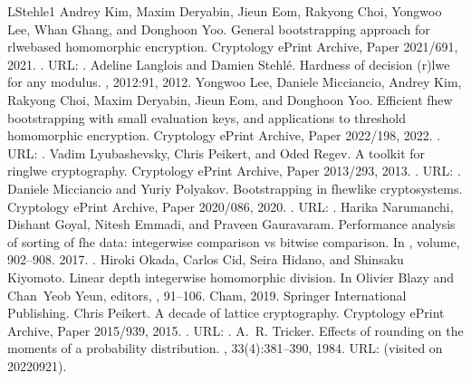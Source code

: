 \documentclass[letterpaper,10pt,english]{jupyterBook}
\begin{document}
\begin{sphinxthebibliography}{LStehle1}
\sphinxAtStartPar
Andrey Kim, Maxim Deryabin, Jieun Eom, Rakyong Choi, Yongwoo Lee, Whan Ghang, and Donghoon Yoo. General bootstrapping approach for rlwe\sphinxhyphen{}based homomorphic encryption. Cryptology ePrint Archive, Paper 2021/691, 2021. . URL: .
\sphinxAtStartPar
Adeline Langlois and Damien Stehlé. Hardness of decision (r)lwe for any modulus. , 2012:91, 2012.
\sphinxAtStartPar
Yongwoo Lee, Daniele Micciancio, Andrey Kim, Rakyong Choi, Maxim Deryabin, Jieun Eom, and Donghoon Yoo. Efficient fhew bootstrapping with small evaluation keys, and applications to threshold homomorphic encryption. Cryptology ePrint Archive, Paper 2022/198, 2022. . URL: .
\sphinxAtStartPar
Vadim Lyubashevsky, Chris Peikert, and Oded Regev. A toolkit for ring\sphinxhyphen{}lwe cryptography. Cryptology ePrint Archive, Paper 2013/293, 2013. . URL: .
\sphinxAtStartPar
Daniele Micciancio and Yuriy Polyakov. Bootstrapping in fhew\sphinxhyphen{}like cryptosystems. Cryptology ePrint Archive, Paper 2020/086, 2020. . URL: .
\sphinxAtStartPar
Harika Narumanchi, Dishant Goyal, Nitesh Emmadi, and Praveen Gauravaram. Performance analysis of sorting of fhe data: integer\sphinxhyphen{}wise comparison vs bit\sphinxhyphen{}wise comparison. In , volume, 902–908. 2017. .
\sphinxAtStartPar
Hiroki Okada, Carlos Cid, Seira Hidano, and Shinsaku Kiyomoto. Linear depth integer\sphinxhyphen{}wise homomorphic division. In Olivier Blazy and Chan Yeob Yeun, editors, , 91–106. Cham, 2019. Springer International Publishing.
\sphinxAtStartPar
Chris Peikert. A decade of lattice cryptography. Cryptology ePrint Archive, Paper 2015/939, 2015. . URL: .
\sphinxAtStartPar
A. R. Tricker. Effects of rounding on the moments of a probability distribution. , 33(4):381–390, 1984. URL:  (visited on 2022\sphinxhyphen{}09\sphinxhyphen{}21).
\end{sphinxthebibliography}
\end{document}
